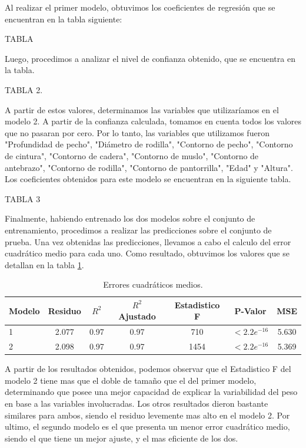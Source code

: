 \documentclass{article} %
\begin{document}
Al realizar el primer modelo, obtuvimos los coeficientes de regresión que se encuentran en la tabla siguiente:


TABLA


Luego, procedimos a analizar el nivel de confianza obtenido, que se encuentra en la tabla.

TABLA 2.

A partir de estos valores, determinamos las variables que utilizaríamos en el modelo 2. A partir de la confianza calculada, tomamos en cuenta todos los valores que no pasaran por cero. Por lo tanto, las variables que utilizamos fueron "Profundidad de pecho", "Diámetro de rodilla", "Contorno de pecho", "Contorno de cintura", "Contorno de cadera", "Contorno de muslo", "Contorno de antebrazo", "Contorno de rodilla", "Contorno de pantorrilla", "Edad" y "Altura". Los coeficientes obtenidos para este modelo se encuentran en la siguiente tabla.

TABLA 3

Finalmente, habiendo entrenado los dos modelos sobre el conjunto de entrenamiento, procedimos a realizar las predicciones sobre el conjunto de prueba. Una vez obtenidas las predicciones, llevamos a cabo el calculo del error cuadrático medio para cada uno. Como resultado, obtuvimos los valores que se detallan en la tabla \ref{tab:table-punto-1-3}.


\begin{table}[H]
	\centering
		\begin{tabular}{||l | c || c || c || c || c || c ||}
			\hline
			\hline
			Modelo & Residuo & $R^2$ & $R^2$ Ajustado & Estadistico F & P-Valor & MSE\\
			\hline			
			\hline
			1 & 2.077 & 0.97 & 0.97 & 710 & $<2.2e^{-16}$ & 5.630\\
			\hline
			2 & 2.098 & 0.97 & 0.97 & 1454 & $<2.2e^{-16}$ & 5.369\\
			\hline
			\hline
		\end{tabular}
		\caption{Errores cuadráticos medios.}
	\label{tab:table-punto-1-3}
\end{table}

A partir de los resultados obtenidos, podemos observar que el Estadistico F del modelo 2 tiene mas que el doble de tamaño que el del primer modelo, determinando que posee una mejor capacidad de explicar la variabilidad del peso en base a las variables involucradas. Los otros resultados dieron bastante similares para ambos, siendo el residuo levemente mas alto en el modelo 2. Por ultimo, el segundo modelo es el que presenta un menor error cuadrático medio, siendo el que tiene un mejor ajuste, y el mas eficiente de los dos.
\end{document}
